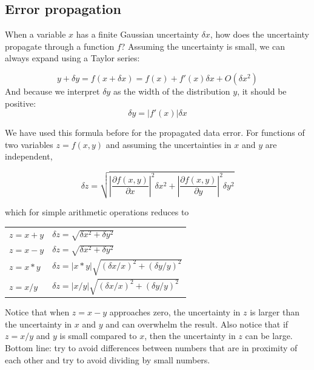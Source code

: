 \documentclass[justified, sixbynine]{tufte-book}
\theoremstyle{plain}%
\newtheorem * {corollary}{Corollary}
\theoremstyle{definition}
\theoremstyle{remark}
\newtheorem * {remark}{Remark}
\newtheorem * {note}{Note}
\begin{document}
\begin{fullwidth}
\goodbreak\subsection{Error propagation}


When a variable $x$ has a finite Gaussian uncertainty $\delta x$, how does the uncertainty propagate through a function $f$? Assuming the uncertainty is small, we can always expand using a Taylor series:

\begin{equation}
y+\delta y = f(x+\delta x) = f(x) + f'(x)\delta x + O(\delta x^2)
\end{equation}
And because we interpret $\delta y$ as the width of the distribution $y$, it should be positive:
\begin{equation}
  \delta y = |f'(x)|\delta x
\end{equation}

We have used this formula before for the propagated data error.
For functions of two variables $z = f(x, y)$ and assuming the uncertainties in $x$ and $y$ are independent,

\begin{equation}
  \delta z = \sqrt{\left|\frac{\partial f(x, y)}{\partial x}\right|^2\delta x^2 +
\left|\frac{\partial f(x, y)}{\partial y}\right|^2\delta y^2 }
\end{equation}

which for simple arithmetic operations reduces to

\begin{tabular}{ll}
  $z = x + y$ &
  $\delta z = \sqrt{\delta x^2 + \delta y^2 }$ \\
  $z = x - y$ &
  $\delta z = \sqrt{\delta x^2 + \delta y^2 }$ \\
  $z = x * y$ &
  $\delta z = |x * y|\sqrt{(\delta x/x)^2 + (\delta y/y)^2 }$ \\
  $z = x / y$ &
  $\delta z = |x/y|\sqrt{(\delta x/x)^2 + (\delta y/y)^2 }$ \\
\end{tabular}

Notice that when $z=x-y$ approaches zero, the uncertainty in $z$ is larger than the uncertainty in $x$ and $y$ and can overwhelm the result.
Also notice that if $z=x/y$ and $y$ is small compared to $x$, then the uncertainty in $z$ can be large.
Bottom line: try to avoid differences between numbers that are in proximity of each other and try to avoid dividing by small numbers.


\end{fullwidth}
\end{document}
